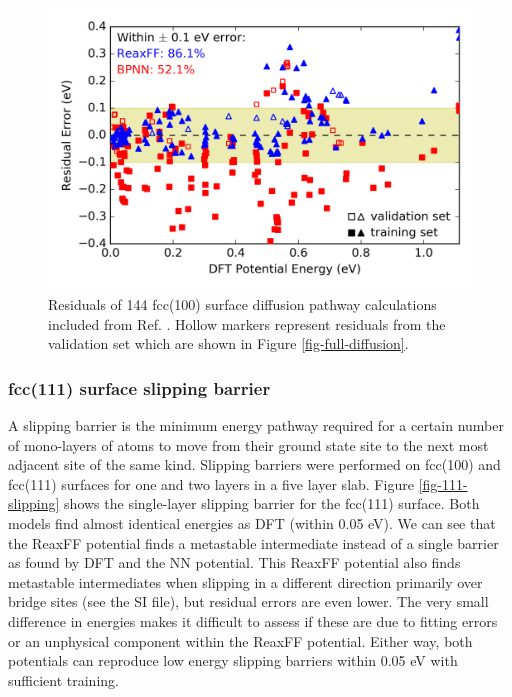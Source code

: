 \documentclass[12pt]{cmuthesis}
\begin{document}
\begin{figure}[h]
\centering
\includegraphics[width=5in]{./images/fig-barrier-residuals.png}
\caption{\label{fig-barrier-residuals}
Residuals of 144 fcc(100) surface diffusion pathway calculations included from Ref. . Hollow markers represent residuals from the validation set which are shown in Figure \ref{fig-full-diffusion}.}
\end{figure}

\subsubsection{fcc(111) surface slipping barrier}
\label{sec:org6fbae62}
A slipping barrier is the minimum energy pathway required for a certain number of mono-layers of atoms to move from their ground state site to the next most adjacent site of the same kind. Slipping barriers were performed on fcc(100) and fcc(111) surfaces for one and two layers in a five layer slab. Figure \ref{fig-111-slipping} shows the single-layer slipping barrier for the fcc(111) surface. Both models find almost identical energies as DFT (within 0.05 eV). We can see that the ReaxFF potential finds a metastable intermediate instead of a single barrier as found by DFT and the NN potential. This ReaxFF potential also finds metastable intermediates when slipping in a different direction primarily over bridge sites (see the SI file), but residual errors are even lower. The very small difference in energies makes it difficult to assess if these are due to fitting errors or an unphysical component within the ReaxFF potential. Either way, both potentials can reproduce low energy slipping barriers within 0.05 eV with sufficient training.
\end{document}
